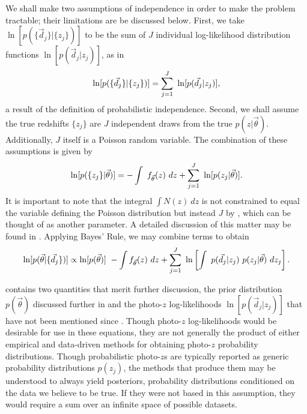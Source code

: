 We shall make two assumptions of independence in order to make the problem tractable; their limitations are be discussed below.  
First, we take $\ln[p(\{\vec{d}_{j}\}|\{z_{j}\})]$ to be the sum of $J$ individual log-likelihood distribution functions $\ln[p(\vec{d}_{j}|z_{j})]$, as in 
\begin{equation}
\eqlabel{eq:indiedat}
\ln[p(\{\vec{d}_{j}\}|\{z_{j}\})] = \sum_{j=1}^{J}\ \ln[p(\vec{d}_{j}|z_{j})],
\end{equation}
a result of the definition of probabilistic independence.  
Second, we shall assume the true redshifts $\{z_{j}\}$ are $J$ independent draws from the true $p(z|\vec{\theta})$.  
Additionally, $J$ itself is a Poisson random variable.  
The combination of these assumptions is given by 
\begin{equation}
\eqlabel{eq:indie}
\ln[p(\{z_{j}\}|\vec{\theta})] = -\int\ f_{\vec{\theta}}(z)\ dz + \sum_{j=1}^{J}\ \ln[p(z_{j}|\vec{\theta})].
\end{equation}
It is important to note that the integral $\int N(z)\ dz$ is not constrained to equal the variable defining the Poisson distribution but instead $J$ by , which can be thought of as another parameter.  
A detailed discussion of this matter may be found in \citet{Foreman-Mackey2014}.  
Applying Bayes' Rule, we may combine terms to obtain 
\begin{equation}
\eqlabel{eq:posterior}
\ln[p(\vec{\theta}|\{\vec{d}_{j}\})] \propto \ln[p(\vec{\theta})]\ -\int f_{\vec{\theta}}(z)\ dz + \sum_{j=1}^{J}\ \ln\left[\int\ p(\vec{d}_{j}|z_{j})\ p(z_{j}|\vec{\theta})\ dz_{j}\right].
\end{equation}

 contains two quantities that merit further discussion, the prior distribution $p(\vec{\theta})$ discussed further in  and the photo-$z$ log-likelihoods $\ln[p(\vec{d}_{j}|z_{j})]$ that have not been mentioned since .  
Though photo-$z$ log-likelihoods would be desirable for use in these equations, they are not generally the product of either empirical and data-driven methods for obtaining photo-$z$ probability distributions.  
Though probabilistic photo-$z$s are typically reported as generic probability distributions $p(z_{j})$, the methods that produce them may be understood to always yield posteriors, probability distributions conditioned on the data we believe to be true.  
If they were not based in this assumption, they would require a sum over an infinite space of possible datasets.

